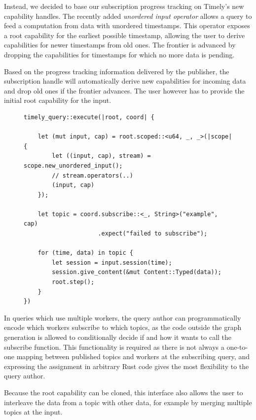 Instead, we decided to base our subscription progress tracking on Timely's new
capability handles. The recently added \emph{unordered input operator} allows
a query to feed a computation from data with unordered timestamps. This operator
exposes a root capability for the earliest possible timestamp, allowing the user
to derive capabilities for newer timestamps from old ones. The frontier
is advanced by dropping the capabilities for timestamps for which no more data
is pending.

Based on the progress tracking information delivered by the publisher, the
subscription handle will automatically derive new capabilities for incoming
data and drop old ones if the frontier advances. The user however has to
provide the initial root capability for the input.

\begin{figure}[htb]
\begin{lstlisting}[caption={[Typical use of the subscription handle]
Typical use of the subscription handle. This query subscribes to a single topic of
strings, with \lstinline{u64} being the type of the timestamps.
}]
timely_query::execute(|root, coord| {

    let (mut input, cap) = root.scoped::<u64, _, _>(|scope| {
        let ((input, cap), stream) = scope.new_unordered_input();
        // stream.operators(..)
        (input, cap)
    });

    let topic = coord.subscribe::<_, String>("example", cap)
                     .expect("failed to subscribe");

    for (time, data) in topic {
        let session = input.session(time);
        session.give_content(&mut Content::Typed(data));
        root.step();
    }
})
\end{lstlisting}
\end{figure}

In queries which use multiple workers, the query author can programmatically
encode which workers subscribe to which topics, as the code outside the
graph generation is allowed to conditionally decide if and how it wants to call
the subscribe function. This functionality is required as there is not
always a one-to-one mapping between published topics and workers at the
subscribing query, and expressing the assignment in arbitrary Rust code
gives the most flexibility to the query author.

Because the root capability can be cloned, this interface also allows the user to
interleave the data from a topic with other data, for example by merging
multiple topics at the input.

